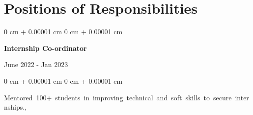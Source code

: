 \documentclass[10pt, letterpaper]{article}
\newenvironment{onecolentry}{
    \begin{adjustwidth}{
        0 cm + 0.00001 cm
    }{
        0 cm + 0.00001 cm
    }
}{
    \end{adjustwidth}
} %
\newenvironment{twocolentry}[2][]{
    \onecolentry
    \def\secondColumn{#2}
    \setcolumnwidth{\fill, 4.5 cm}
    \begin{paracol}{2}
}{
    \switchcolumn \raggedleft \secondColumn
    \end{paracol}
    \endonecolentry
} %
\begin{document}
    

    \section{Positions of Responsibilities}

        
        \begin{samepage}
            \begin{twocolentry}{
                June 2022 - Jan 2023
            }
                \textbf{Internship Co-ordinator}
            \end{twocolentry}

            \vspace{0.10 cm}
            
            \begin{onecolentry}
                \mbox{Mentored 100+ students in improving technical and soft skills to secure internships.}, 
                \vspace{0.10 cm}
                
        \end{onecolentry}
        \end{samepage}

    
\end{document}
